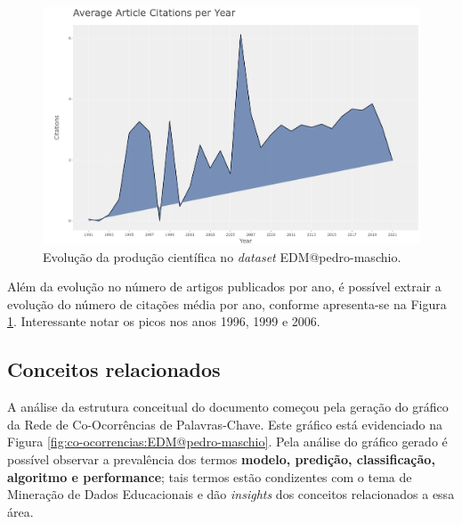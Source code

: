 \begin{figure}[H]
    \centering
    \includegraphics[width=1\textwidth]{experiments/pedro-maschio/PesquisaBibliogr/MineracaoDadosEducacionais/images/citacoes-media-anual.png}
    \caption{Evolução da produção científica no \textit{dataset} EDM@pedro-maschio.}
    \label{fig:citacoes:anual:EDM@pedro-maschio}
\end{figure}

Além da evolução no número de artigos publicados por ano, é possível extrair a evolução do número de citações média por ano, conforme apresenta-se na Figura \ref{fig:citacoes:anual:EDM@pedro-maschio}. Interessante notar os picos nos anos 1996, 1999 e 2006.


\subsection{Conceitos relacionados}

A análise da estrutura conceitual do documento começou pela geração do gráfico da Rede de Co-Ocorrências de Palavras-Chave. Este gráfico está evidenciado na Figura \ref{fig:co-ocorrencias:EDM@pedro-maschio}. Pela análise do gráfico gerado é possível observar a prevalência dos termos \textbf{modelo, predição, classificação, algoritmo e performance}; tais termos estão condizentes com o tema de Mineração de Dados Educacionais e dão \textit{insights} dos conceitos relacionados a essa área.

